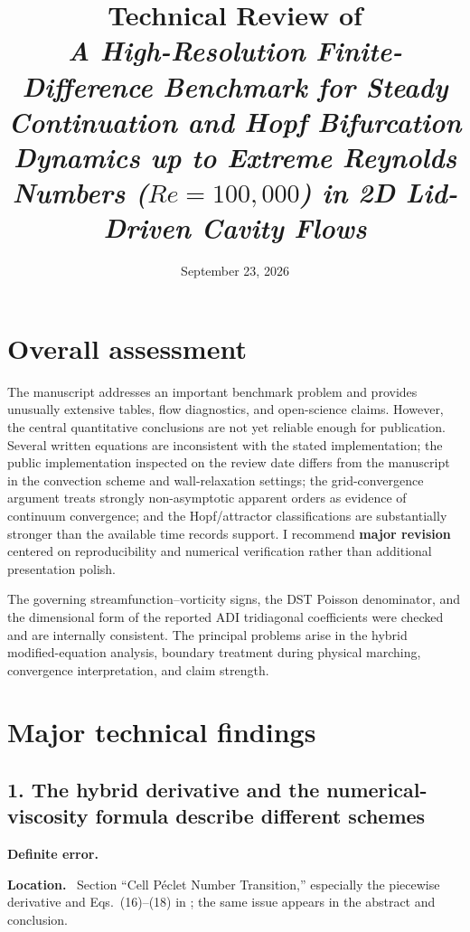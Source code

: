 \documentclass[11pt,a4paper]{article}
\title{Technical Review of\\
\textit{A High-Resolution Finite-Difference Benchmark for Steady Continuation and Hopf Bifurcation Dynamics up to Extreme Reynolds Numbers ($Re=100{,}000$) in 2D Lid-Driven Cavity Flows}}
\author{}
\date{September 23, 2026}
\newcommand{\classify}[1]{\textcolor{blue!65!black}{\textbf{#1}}}
\newcommand{\field}[1]{\par\noindent\textbf{#1}\ }
\begin{document}
\maketitle

\section*{Overall assessment}

The manuscript addresses an important benchmark problem and provides unusually extensive tables, flow diagnostics, and open-science claims. However, the central quantitative conclusions are not yet reliable enough for publication. Several written equations are inconsistent with the stated implementation; the public implementation inspected on the review date differs from the manuscript in the convection scheme and wall-relaxation settings; the grid-convergence argument treats strongly non-asymptotic apparent orders as evidence of continuum convergence; and the Hopf/attractor classifications are substantially stronger than the available time records support. I recommend \textbf{major revision} centered on reproducibility and numerical verification rather than additional presentation polish.

The governing streamfunction--vorticity signs, the DST Poisson denominator, and the dimensional form of the reported ADI tridiagonal coefficients were checked and are internally consistent. The principal problems arise in the hybrid modified-equation analysis, boundary treatment during physical marching, convergence interpretation, and claim strength.

\section*{Major technical findings}

\subsection*{1. The hybrid derivative and the numerical-viscosity formula describe different schemes}

\classify{Definite error.}

\field{Location.} Section ``Cell P\'eclet Number Transition,'' especially the piecewise derivative and Eqs.~(16)--(18) in ; the same issue appears in the abstract and conclusion.
\end{document}
